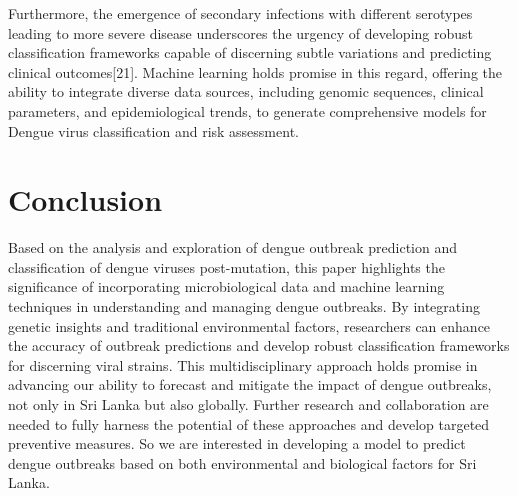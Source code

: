 \documentclass[conference]{IEEEtran}
\begin{document}
Furthermore, the emergence of secondary infections with different serotypes leading to more
severe disease underscores the urgency of developing robust classification frameworks capable
of discerning subtle variations and predicting clinical outcomes[21]. Machine learning holds
promise in this regard, offering the ability to integrate diverse data sources, including
genomic sequences, clinical parameters, and epidemiological trends, to generate comprehensive
models for Dengue virus classification and risk assessment. \\

\section{Conclusion}

Based on the analysis and exploration of dengue outbreak prediction and classification of dengue
viruses post-mutation, this paper highlights the significance of incorporating microbiological
data and machine learning techniques in understanding and managing dengue outbreaks. By
integrating genetic insights and traditional environmental factors, researchers can enhance
the accuracy of outbreak predictions and develop robust classification frameworks for discerning
viral strains. This multidisciplinary approach holds promise in advancing our ability to forecast
and mitigate the impact of dengue outbreaks, not only in Sri Lanka but also globally. Further
research and collaboration are needed to fully harness the potential of these approaches and
develop targeted preventive measures. So we are interested  in developing a model to predict
dengue outbreaks based on both environmental and biological factors for Sri Lanka. \\
\end{document}
